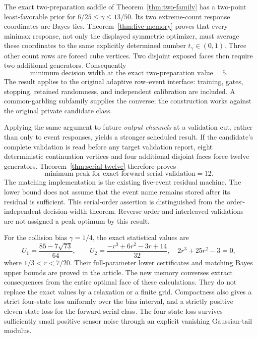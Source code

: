 The exact two-preparation saddle of Theorem~\ref{thm:two-family} has a
two-point least-favorable prior for $6/25\le\gamma\le13/50$.
Its two extreme-count response coordinates are Bayes ties.
Theorem~\ref{thm:five-memory} proves that every minimax response, not
only the displayed symmetric optimizer, must average these coordinates
to the same explicitly determined number $t_\gamma\in(0,1)$.
Three other count rows are forced cube vertices. Two disjoint exposed
faces then require two additional generators. Consequently
\[
 \boxed{\text{minimum decision width at the exact two-preparation value}=5.}
\]
The result applies to the original adaptive row--event interface:
training, gates, stopping, retained randomness, and independent calibration
are included. A common-garbling subfamily supplies the converse; the
construction works against the original private candidate class.

Applying the same argument to future \emph{output channels} at a
validation cut, rather than only to event responses, yields a stronger
scheduled result. If the candidate's complete validation is read before
any target validation report, eight deterministic continuation vertices
and four additional disjoint faces force twelve generators. Theorem~\ref{thm:serial-twelve}
therefore proves
\[
 \boxed{\text{minimum peak for exact forward serial validation}=12.}
\]
The matching implementation is the existing five-event residual machine.
The lower bound does not assume that the event name remains stored after
its residual is sufficient. This serial-order assertion is distinguished
from the order-independent decision-width theorem. Reverse-order and
interleaved validations are not assigned a peak optimum by this result.

For the collision bias $\gamma=1/4$, the exact statistical values are
\begin{equation}\label{eq:intro-exact-values}
 U_1=\frac{85-7\sqrt{73}}{64},\qquad
 U_2=\frac{-r^3+6r^2-3r+14}{32},\quad 2r^3+25r^2-3=0,
\end{equation}
where $1/3<r<7/20$. Their full-parameter lower certificates and matching
Bayes upper bounds are proved in the article. The new memory converses
extract consequences from the entire optimal face of these calculations.
They do not replace the exact values by a relaxation or a finite grid.
Compactness also gives a strict four-state loss uniformly over the
bias interval, and a strictly positive eleven-state loss for the forward
serial class. The four-state loss survives sufficiently small positive
sensor noise through an explicit vanishing Gaussian-tail modulus.

